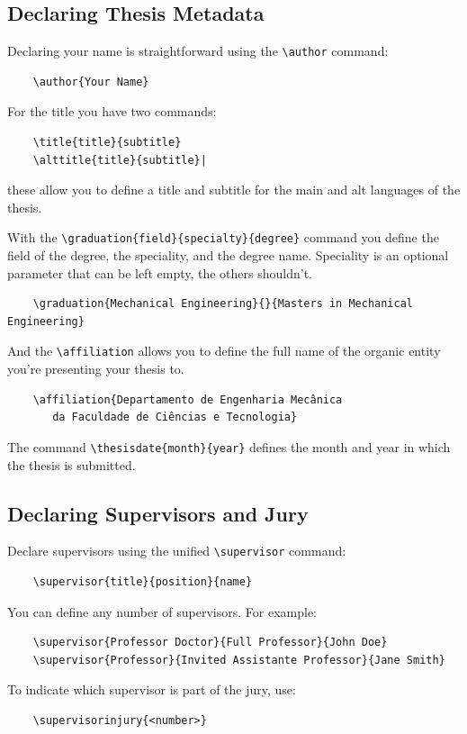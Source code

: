 \subsection{Declaring Thesis Metadata}
Declaring your name is straightforward using the \verb|\author| command:
\begin{verbatim}
    \author{Your Name}
\end{verbatim}
For the title you have two commands:
\begin{verbatim}
    \title{title}{subtitle}
    \alttitle{title}{subtitle}|
\end{verbatim}
these allow you to define a title and subtitle for the main and alt languages of the thesis.

With the \verb|\graduation{field}{specialty}{degree}| command you define the field of the degree, the speciality, and the degree name. Speciality is an optional parameter that can be left empty, the others shouldn't.
\begin{verbatim}
    \graduation{Mechanical Engineering}{}{Masters in Mechanical Engineering}
\end{verbatim}

And the \verb|\affiliation| allows you to define the full name of the organic entity you're presenting your thesis to.
\begin{verbatim}
    \affiliation{Departamento de Engenharia Mecânica
       da Faculdade de Ciências e Tecnologia}
\end{verbatim}

The command \verb|\thesisdate{month}{year}| defines the month and year in which the thesis is submitted.

\subsection{Declaring Supervisors and Jury}

Declare supervisors using the unified \verb|\supervisor| command:
\begin{verbatim}
    \supervisor{title}{position}{name}
\end{verbatim}

You can define any number of supervisors. For example:
\begin{verbatim}
    \supervisor{Professor Doctor}{Full Professor}{John Doe}
    \supervisor{Professor}{Invited Assistante Professor}{Jane Smith}
\end{verbatim}

To indicate which supervisor is part of the jury, use:
\begin{verbatim}
    \supervisorinjury{<number>}
\end{verbatim}

